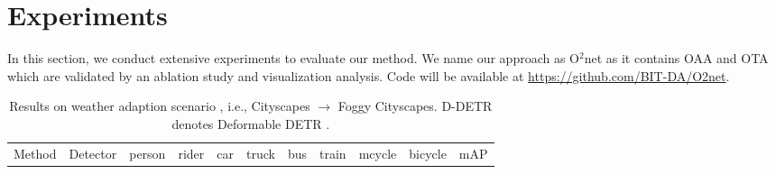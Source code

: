 \documentclass[sigconf]{acmart}
\begin{document}
\section{Experiments}
In this section, we conduct extensive experiments to evaluate our method. We name our approach as O$^2$net as it contains OAA and OTA which are validated by an ablation study and visualization analysis. Code will be available at \url{https://github.com/BIT-DA/O2net}.




\begin{table*}[t]
\centering
            \small
            \caption{Results on weather adaption scenario , i.e., Cityscapes $\rightarrow$ Foggy Cityscapes. D-DETR denotes Deformable DETR \cite{zhu2020deformable}.} 
            \label{tab:foggy}
            \setlength{\tabcolsep}{3.2mm}
            \begin{tabular}{c|c|cccccccc|c}
                \toprule[1.0pt]
                Method & Detector & person & rider & car & truck & bus & train & mcycle & bicycle & mAP \\
            

\end{tabular}
\end{table*}
\end{document}
